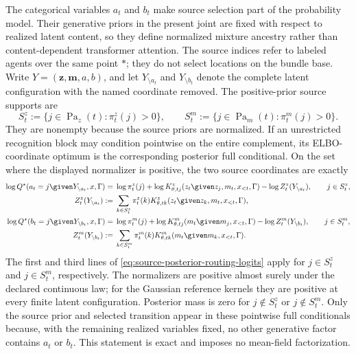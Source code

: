 The categorical variables $a_t$ and $b_t$ make source selection part of the probability model. Their generative priors in the present joint are fixed with respect to realized latent content, so they define normalized mixture ancestry rather than content-dependent transformer attention. The source indices refer to labeled agents over the same point $\ast$; they do not select locations on the bundle base. Write $Y=(\boldsymbol z,\boldsymbol m,a,b)$, and let $Y_{\setminus a_t}$ and $Y_{\setminus b_t}$ denote the complete latent configuration with the named coordinate removed. The positive-prior source supports are
\begin{equation}
S_t^z
:=\{j\in\operatorname{Pa}_z(t):\pi_t^z(j)>0\},
\qquad
S_t^m
:=\{j\in\operatorname{Pa}_m(t):\pi_t^m(j)>0\}.
\label{eq:positive-source-prior-supports}
\end{equation}
They are nonempty because the source priors are normalized. If an unrestricted recognition block may condition pointwise on the entire complement, its ELBO-coordinate optimum is the corresponding posterior full conditional. On the set where the displayed normalizer is positive, the two source coordinates are exactly
\begin{equation}
\begin{aligned}
\log Q^\star(a_t=j\given Y_{\setminus a_t},x,\Gamma)
={}&\log\pi_t^z(j)
+\log K^z_{\theta,tj}
(z_t\given z_j,m_t,x_{<t},\Gamma)
-\log Z_t^z(Y_{\setminus a_t}),
\qquad j\in S_t^z,\\
Z_t^z(Y_{\setminus a_t})
:={}&\sum_{k\in S_t^z}
\pi_t^z(k)
K^z_{\theta,tk}
(z_t\given z_k,m_t,x_{<t},\Gamma),\\
\log Q^\star(b_t=j\given Y_{\setminus b_t},x,\Gamma)
={}&\log\pi_t^m(j)
+\log K^m_{\theta,tj}
(m_t\given m_j,x_{<t},\Gamma)
-\log Z_t^m(Y_{\setminus b_t}),
\qquad j\in S_t^m,\\
Z_t^m(Y_{\setminus b_t})
:={}&\sum_{k\in S_t^m}
\pi_t^m(k)
K^m_{\theta,tk}
(m_t\given m_k,x_{<t},\Gamma).
\end{aligned}
\label{eq:source-posterior-routing-logits}
\end{equation}
The first and third lines of \cref{eq:source-posterior-routing-logits} apply for $j\in S_t^z$ and $j\in S_t^m$, respectively. The normalizers are positive almost surely under the declared continuous law; for the Gaussian reference kernels they are positive at every finite latent configuration. Posterior mass is zero for $j\notin S_t^z$ or $j\notin S_t^m$. Only the source prior and selected transition appear in these pointwise full conditionals because, with the remaining realized variables fixed, no other generative factor contains $a_t$ or $b_t$. This statement is exact and imposes no mean-field factorization.

